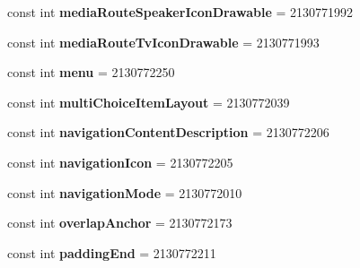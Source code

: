 \begin{DoxyCompactItemize}
\mbox{\label{classXaria_1_1Resource_1_1Attribute_aa59b3df2329bfa3109f711882481a2f0}} 
const int {\bfseries media\+Route\+Speaker\+Icon\+Drawable} = 2130771992
\item 
\mbox{\label{classXaria_1_1Resource_1_1Attribute_ae1c6b507ec26bb00691d7fde1e6bb0cb}} 
const int {\bfseries media\+Route\+Tv\+Icon\+Drawable} = 2130771993
\item 
\mbox{\label{classXaria_1_1Resource_1_1Attribute_a711c160a3686644322ffc7e94d6cc3c6}} 
const int {\bfseries menu} = 2130772250
\item 
\mbox{\label{classXaria_1_1Resource_1_1Attribute_a25a821918773185a41731fe2d29b50a8}} 
const int {\bfseries multi\+Choice\+Item\+Layout} = 2130772039
\item 
\mbox{\label{classXaria_1_1Resource_1_1Attribute_a4ec6a2f436c8e36140e4c21e7b041616}} 
const int {\bfseries navigation\+Content\+Description} = 2130772206
\item 
\mbox{\label{classXaria_1_1Resource_1_1Attribute_a3bbb44f9753b0a6ecbce01edc4544a6e}} 
const int {\bfseries navigation\+Icon} = 2130772205
\item 
\mbox{\label{classXaria_1_1Resource_1_1Attribute_ab9dd853531c006430b777862c4bb8f2c}} 
const int {\bfseries navigation\+Mode} = 2130772010
\item 
\mbox{\label{classXaria_1_1Resource_1_1Attribute_aa3bd6f1404bd93cc412de4a4ab9994a9}} 
const int {\bfseries overlap\+Anchor} = 2130772173
\item 
\mbox{\label{classXaria_1_1Resource_1_1Attribute_ae457d2dfb3b5969127eb8d50e839e275}} 
const int {\bfseries padding\+End} = 2130772211
\item 
\mbox{\label{classXaria_1_1Resource_1_1Attribute_a99cde42d8ac325e11fba404465939bf5}} 

\end{DoxyCompactItemize}
